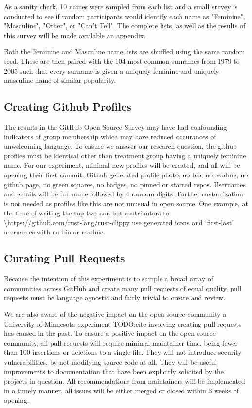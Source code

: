 \documentclass[journal,12pt,onecolumn,]{IEEEtran}
\begin{document}
As a sanity check, 10 names were sampled from each list and a small survey is conducted to see if random participants would identify each name as "Feminine", "Masculine", "Other", or "Can't Tell".
The complete lists, as well as the results of this survey will be made available an appendix.

Both the Feminine and Masculine name lists are shuffled using the same random seed.
These are then paired with the 104 most common surnames from 1979 to 2005 such that every surname is given a uniquely feminine and uniquely masculine name of similar popularity.

\subsection{Creating Github Profiles}

The results in the GitHub Open Source Survey may have had confounding indicators of group membership which may have reduced occurances of unwelcoming language.
To ensure we answer our research question, the github profiles must be identical other than treatment group having a uniquely feminine name.
For our experiment, minimal new profiles will be created, and all will be opening their first commit.
Github generated profile photo, no bio, no readme, no github page, no green squares, no badges, no pinned or starred repos.
Usernames and emails will be full name followed by 4 random digits.
Further customization is not needed as profiles like this are not unusual in open source.
One example, at the time of writing the top two non-bot contributors to \url{\https://github.com/rust-lang/rust-clippy} use generated icons and `first-last' usernames with no bio or readme.

\subsection{Curating Pull Requests} %

Because the intention of this experiment is to sample a broad array of communities across GitHub and create many pull requests of equal quality, pull requests must be language agnostic and fairly trivial to create and review.

We are also aware of the negative impact on the open source community a University of Minnesota experiment TODO:cite involving creating pull requests has caused in the past.
To ensure a positive impact on the open source community, all pull requests will require minimal maintainer time, being fewer than 100 insertions or deletions to a single file.
They will not introduce security vulnerabilities, by not modifying source code at all.
They will be useful improvements to documentation that have been explicitly solicited by the projects in question.
All recommendations from maintainers will be implemented in a timely manner, all issues will be either merged or closed within 3 weeks of opening.
\end{document}
